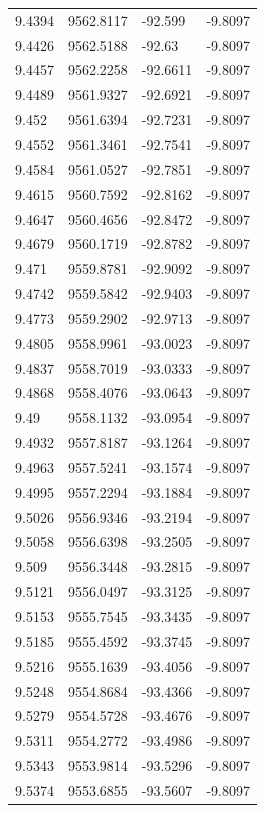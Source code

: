 \begin{table}[H]
\begin{tabular}{llll}
9.4394 & 9562.8117 & -92.599 & -9.8097 \\
9.4426 & 9562.5188 & -92.63 & -9.8097 \\
9.4457 & 9562.2258 & -92.6611 & -9.8097 \\
9.4489 & 9561.9327 & -92.6921 & -9.8097 \\
9.452 & 9561.6394 & -92.7231 & -9.8097 \\
9.4552 & 9561.3461 & -92.7541 & -9.8097 \\
9.4584 & 9561.0527 & -92.7851 & -9.8097 \\
9.4615 & 9560.7592 & -92.8162 & -9.8097 \\
9.4647 & 9560.4656 & -92.8472 & -9.8097 \\
9.4679 & 9560.1719 & -92.8782 & -9.8097 \\
9.471 & 9559.8781 & -92.9092 & -9.8097 \\
9.4742 & 9559.5842 & -92.9403 & -9.8097 \\
9.4773 & 9559.2902 & -92.9713 & -9.8097 \\
9.4805 & 9558.9961 & -93.0023 & -9.8097 \\
9.4837 & 9558.7019 & -93.0333 & -9.8097 \\
9.4868 & 9558.4076 & -93.0643 & -9.8097 \\
9.49 & 9558.1132 & -93.0954 & -9.8097 \\
9.4932 & 9557.8187 & -93.1264 & -9.8097 \\
9.4963 & 9557.5241 & -93.1574 & -9.8097 \\
9.4995 & 9557.2294 & -93.1884 & -9.8097 \\
9.5026 & 9556.9346 & -93.2194 & -9.8097 \\
9.5058 & 9556.6398 & -93.2505 & -9.8097 \\
9.509 & 9556.3448 & -93.2815 & -9.8097 \\
9.5121 & 9556.0497 & -93.3125 & -9.8097 \\
9.5153 & 9555.7545 & -93.3435 & -9.8097 \\
9.5185 & 9555.4592 & -93.3745 & -9.8097 \\
9.5216 & 9555.1639 & -93.4056 & -9.8097 \\
9.5248 & 9554.8684 & -93.4366 & -9.8097 \\
9.5279 & 9554.5728 & -93.4676 & -9.8097 \\
9.5311 & 9554.2772 & -93.4986 & -9.8097 \\
9.5343 & 9553.9814 & -93.5296 & -9.8097 \\
9.5374 & 9553.6855 & -93.5607 & -9.8097 \\

\end{tabular}
\end{table}
